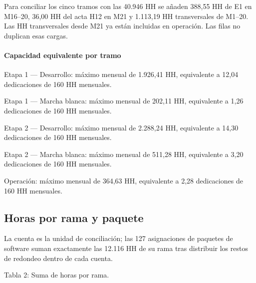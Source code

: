 Para conciliar los cinco tramos con las 40.946 HH se añaden 388,55 HH de E1 en M16–20, 36,00 HH del acta H12 en M21 y 1.113,19 HH transversales de M1–20. Las HH transversales desde M21 ya están incluidas en operación. Las filas no duplican esas cargas.

\paragraph{Capacidad equivalente por tramo}

Etapa 1 — Desarrollo: máximo mensual de 1.926,41 HH, equivalente a 12,04 dedicaciones de 160 HH mensuales.

Etapa 1 — Marcha blanca: máximo mensual de 202,11 HH, equivalente a 1,26 dedicaciones de 160 HH mensuales.

Etapa 2 — Desarrollo: máximo mensual de 2.288,24 HH, equivalente a 14,30 dedicaciones de 160 HH mensuales.

Etapa 2 — Marcha blanca: máximo mensual de 511,28 HH, equivalente a 3,20 dedicaciones de 160 HH mensuales.

Operación: máximo mensual de 364,63 HH, equivalente a 2,28 dedicaciones de 160 HH mensuales.

\subsection{Horas por rama y paquete}

La cuenta es la unidad de conciliación; las 127 asignaciones de paquetes de software suman exactamente las 12.116 HH de su rama tras distribuir los restos de redondeo dentro de cada cuenta.

Tabla 2: Suma de horas por rama.

